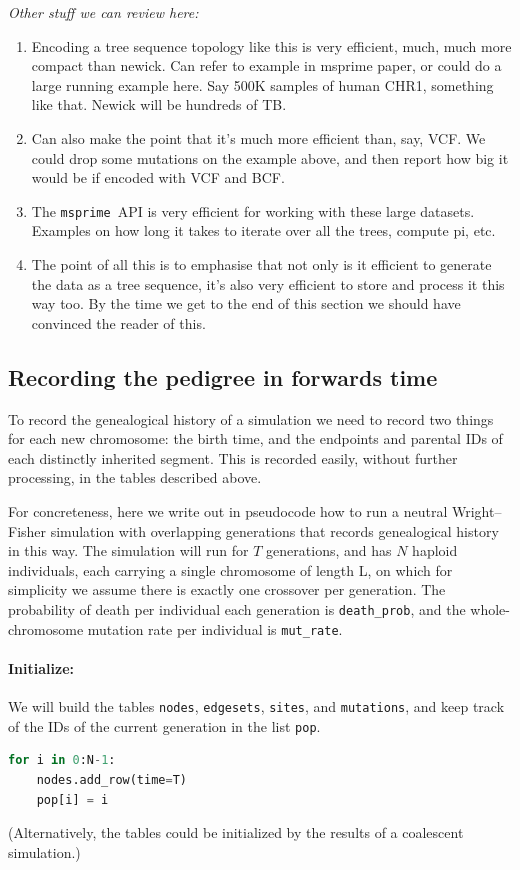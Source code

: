 \documentclass{article}
\newcommand{\msprime}{\texttt{msprime}}
\newcommand{\nodes}{\texttt{nodes}}
\newcommand{\edgesets}{\texttt{edgesets}}
\newcommand{\sites}{\texttt{sites}}
\newcommand{\mutations}{\texttt{mutations}}
\newcommand{\jk}[1]{{\em \color{red} #1}}
\begin{document}
\jk{Other stuff we can review here:}
\begin{enumerate}
\item Encoding a tree sequence topology like this is very efficient, much, much more compact than newick.
Can refer to example in msprime paper, or could do a large running example here. Say 500K samples of
human CHR1, something like that. Newick will be hundreds of TB.

\item Can also make the point that it's much more efficient than, say, VCF. We could drop some
mutations on the example above, and then report how big it would be if encoded with VCF and BCF.

\item The \msprime\ API is very efficient for working with these large datasets. Examples on
how long it takes to iterate over all the trees, compute pi, etc.

\item The point of all this is to emphasise that not only is it efficient to generate the
data as a tree sequence, it's also very efficient to store and process it this way too. By the
time we get to the end of this section we should have convinced the reader of this.

\end{enumerate}


\subsection*{Recording the pedigree in forwards time}

To record the genealogical history of a simulation
we need to record two things for each new chromosome:
the birth time,
and the endpoints and parental IDs of each distinctly inherited segment.
This is recorded easily, without further processing,
in the tables described above.

For concreteness, here we write out in pseudocode
how to run a neutral Wright--Fisher simulation
with overlapping generations
that records genealogical history in this way.
The simulation will run for $T$ generations,
and has $N$ haploid individuals, each carrying a single chromosome of length L,
on which for simplicity we assume there is exactly one crossover per generation.
The probability of death per individual each generation is \texttt{death\_prob},
and the whole-chromosome mutation rate per individual is \texttt{mut\_rate}.

\paragraph{Initialize:}
We will build the tables \nodes, \edgesets, \sites, and \mutations,
and keep track of the IDs of the current generation in the list \texttt{pop}.
\begin{lstlisting}[language=Python]
for i in 0:N-1:
    nodes.add_row(time=T)
    pop[i] = i
\end{lstlisting}
(Alternatively, the tables could be initialized by the results of a coalescent simulation.)
\end{document}
